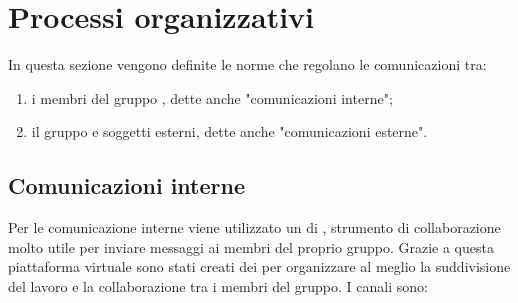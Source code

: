 \section{Processi organizzativi}
In questa sezione vengono definite le norme che regolano le comunicazioni tra:
\begin{enumerate}
	\item i membri del gruppo \Gruppo{}, dette anche "comunicazioni interne";
	\item il gruppo e soggetti esterni, dette anche "comunicazioni esterne".
\end{enumerate}
	
\subsection{Comunicazioni interne}
Per le comunicazione interne viene utilizzato un  di , strumento di collaborazione molto utile per inviare messaggi ai membri del proprio gruppo.
Grazie a questa piattaforma virtuale sono stati creati dei  per organizzare al meglio la suddivisione del lavoro e la collaborazione tra i membri del gruppo.
I canali sono:

